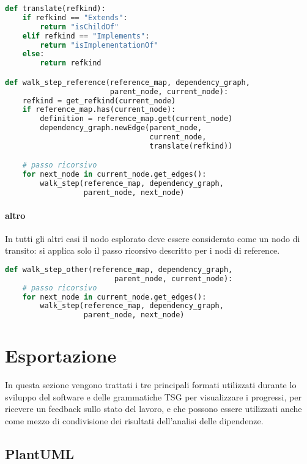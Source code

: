 \begin{lstlisting}[language=Python, caption=pseudocodice]
def translate(refkind):
    if refkind == "Extends":
        return "isChildOf"
    elif refkind == "Implements":
        return "isImplementationOf"
    else:
        return refkind

def walk_step_reference(reference_map, dependency_graph,
                        parent_node, current_node):
    refkind = get_refkind(current_node)
    if reference_map.has(current_node):
        definition = reference_map.get(current_node)
        dependency_graph.newEdge(parent_node,
                                 current_node,
                                 translate(refkind))

    # passo ricorsivo
    for next_node in current_node.get_edges():
        walk_step(reference_map, dependency_graph,
                  parent_node, next_node)
\end{lstlisting}

\paragraph{altro}

In tutti gli altri casi il nodo esplorato deve essere considerato come un nodo di transito: si applica solo il passo ricorsivo descritto per i nodi di reference.

\begin{lstlisting}[language=Python, caption=pseudocodice]
def walk_step_other(reference_map, dependency_graph,
                         parent_node, current_node):
    # passo ricorsivo
    for next_node in current_node.get_edges():
        walk_step(reference_map, dependency_graph,
                  parent_node, next_node)
\end{lstlisting}

\section{Esportazione}

In questa sezione vengono trattati i tre principali formati utilizzati durante lo sviluppo del software e delle grammatiche TSG per visualizzare i progressi, per ricevere un feedback sullo stato del lavoro, e che possono essere utilizzati anche come mezzo di condivisione dei risultati dell'analisi delle dipendenze.

\subsection{PlantUML}

